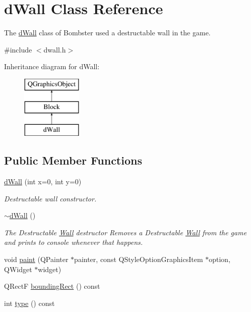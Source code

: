 \hypertarget{classd_wall}{\section{d\-Wall Class Reference}
\label{classd_wall}
}


The \hyperlink{classd_wall}{d\-Wall} class of Bombster used a destructable wall in the game.  




{\ttfamily \#include $<$dwall.\-h$>$}

Inheritance diagram for d\-Wall\-:\begin{figure}[H]
\begin{center}
\leavevmode
\includegraphics[height=3.000000cm]{classd_wall}
\end{center}
\end{figure}
\subsection*{Public Member Functions}
\begin{DoxyCompactItemize}
\item 
\hyperlink{classd_wall_a09862932157c8e5f8a59b22b3222d816}{d\-Wall} (int x=0, int y=0)
\begin{DoxyCompactList}\small\item\em Destructable wall constructor. \end{DoxyCompactList}\item 
\hyperlink{classd_wall_ae3e072cee7b80cf20387c3d634cb994a}{$\sim$d\-Wall} ()
\begin{DoxyCompactList}\small\item\em The Destructable \hyperlink{class_wall}{Wall} destructor Removes a Destructable \hyperlink{class_wall}{Wall} from the game and prints to console whenever that happens. \end{DoxyCompactList}\item 
void \hyperlink{classd_wall_aeaec158ea8576bfe6d40d8197ffceaf6}{paint} (Q\-Painter $\ast$painter, const Q\-Style\-Option\-Graphics\-Item $\ast$option, Q\-Widget $\ast$widget)
\item 
Q\-Rect\-F \hyperlink{classd_wall_a84d4bba890333394f10c5497379d894c}{bounding\-Rect} () const 
\item 
int \hyperlink{classd_wall_a487ce8ea99822ad1e182e8319db62f9c}{type} () const 
\end{DoxyCompactItemize}
